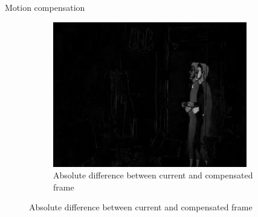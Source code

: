 \documentclass[aspectratio=1610,xcolor=dvipsnames]{beamer}
\begin{document}
\begin{frame}{Motion compensation}
\begin{figure}[htbp]
\begin{subfigure}[b]{0.3\textwidth}
            \includegraphics[width=.9\textwidth]{images/pan240-diff-curr-comp.png}
            \caption{Absolute difference between current and compensated frame}
            \label{fig:pan240-diff-curr-comp}
        \end{subfigure}
    
    \end{figure}
\end{frame}
\end{document}
